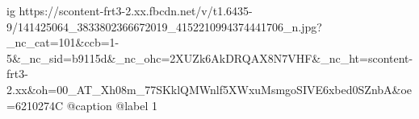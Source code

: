  
 
 
 
 

\ifcmt
  ig https://scontent-frt3-2.xx.fbcdn.net/v/t1.6435-9/141425064_3833802366672019_4152210994374441706_n.jpg?_nc_cat=101&ccb=1-5&_nc_sid=b9115d&_nc_ohc=2XUZk6AkDRQAX8N7VHF&_nc_ht=scontent-frt3-2.xx&oh=00_AT_Xh08m_77SKklQMWnlf5XWxuMsmgoSIVE6xbed0SZnbA&oe=6210274C
  @caption @label 1
\fi
